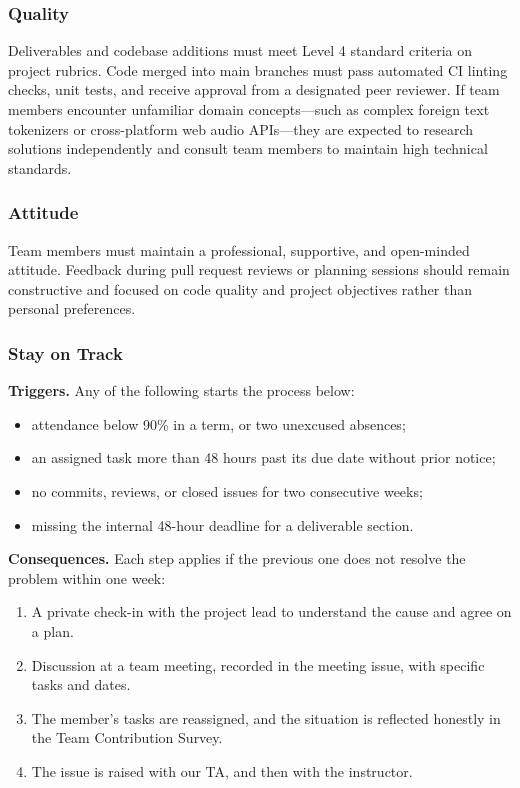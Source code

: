 \documentclass{article}
\begin{document}
\subsubsection*{Quality} 
Deliverables and codebase additions must meet Level 4 standard criteria on project rubrics. Code merged into main branches must pass automated CI linting checks, unit tests, and receive approval from a designated peer reviewer. If team members encounter unfamiliar domain concepts—such as complex foreign text tokenizers or cross-platform web audio APIs—they are expected to research solutions independently and consult team members to maintain high technical standards.

\subsubsection*{Attitude}
Team members must maintain a professional, supportive, and open-minded attitude. Feedback during pull request reviews or planning sessions should remain constructive and focused on code quality and project objectives rather than personal preferences.

\subsubsection*{Stay on Track}
\textbf{Triggers.} Any of the following starts the process below:
\begin{itemize}
    \item attendance below 90\% in a term, or two unexcused absences;
    \item an assigned task more than 48 hours past its due date without prior
    notice;
    \item no commits, reviews, or closed issues for two consecutive weeks;
    \item missing the internal 48-hour deadline for a deliverable section.
\end{itemize}

\textbf{Consequences.} Each step applies if the previous one does not resolve
the problem within one week:
\begin{enumerate}
    \item A private check-in with the project lead to understand the cause and
    agree on a plan.
    \item Discussion at a team meeting, recorded in the meeting issue, with
    specific tasks and dates.
    \item The member's tasks are reassigned, and the situation is reflected
    honestly in the Team Contribution Survey.
    \item The issue is raised with our TA, and then with the instructor.
\end{enumerate}
\end{document}
